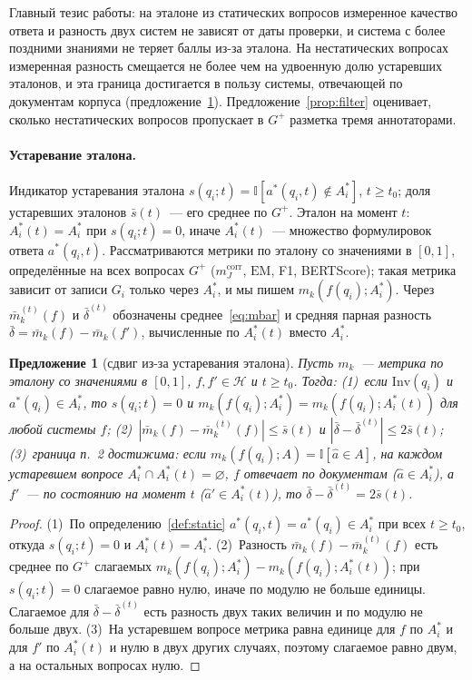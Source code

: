 \documentclass{article}
\newtheorem{proposition}[theorem]{Предложение}%
\newcommand{\I}{\mathbb{I}}                         %
\newcommand{\Inv}{\mathrm{Inv}}
\newcommand{\EM}{\mathrm{EM}}
\newcommand{\mcorr}{m_J^{\mathrm{corr}}}
\begin{document}
Главный тезис работы: на эталоне из статических вопросов измеренное качество ответа и разность двух систем не зависят от даты проверки, и система с более поздними знаниями не теряет баллы из-за эталона. На нестатических вопросах измеренная разность смещается не более чем на удвоенную долю устаревших эталонов, и эта граница достигается в пользу системы, отвечающей по документам корпуса (предложение~\ref{prop:bias}). Предложение~\ref{prop:filter} оценивает, сколько нестатических вопросов пропускает в $G^+$ разметка тремя аннотаторами.

\paragraph{Устаревание эталона.} Индикатор устаревания эталона $s(q_i;t)=\I[a^*(q_i,t)\notin A^*_i]$, $t\ge t_0$; доля устаревших эталонов $\bar s(t)$~--- его среднее по $G^+$. Эталон на момент $t$: $A^*_i(t)=A^*_i$ при $s(q_i;t)=0$, иначе $A^*_i(t)$~--- множество формулировок ответа $a^*(q_i,t)$. Рассматриваются метрики по эталону со значениями в $[0,1]$, определённые на всех вопросах $G^+$ ($\mcorr$, $\EM$, F1, BERTScore); такая метрика зависит от записи $G_i$ только через $A^*_i$, и мы пишем $m_k(f(q_i);A^*_i)$. Через $\bar m_k^{(t)}(f)$ и $\bar\delta^{(t)}$ обозначены среднее~\eqref{eq:mbar} и средняя парная разность $\bar\delta=\bar m_k(f)-\bar m_k(f')$, вычисленные по $A^*_i(t)$ вместо $A^*_i$.

\begin{proposition}[сдвиг из-за устаревания эталона]\label{prop:bias}
Пусть $m_k$~--- метрика по эталону со значениями в $[0,1]$, $f,f'\in\mathcal{H}$ и $t\ge t_0$. Тогда:
(1)~если $\Inv(q_i)$ и $a^*(q_i)\in A^*_i$, то $s(q_i;t)=0$ и $m_k(f(q_i);A^*_i)=m_k(f(q_i);A^*_i(t))$ для любой системы $f$;
(2)~$|\bar m_k(f)-\bar m_k^{(t)}(f)|\le\bar s(t)$ и $|\bar\delta-\bar\delta^{(t)}|\le2\bar s(t)$;
(3)~граница п.~2 достижима: если $m_k(f(q_i);A)=\I[\hat a\in A]$, на каждом устаревшем вопросе $A^*_i\cap A^*_i(t)=\varnothing$, $f$ отвечает по документам ($\hat a\in A^*_i$), а $f'$~--- по состоянию на момент $t$ ($\hat a'\in A^*_i(t)$), то $\bar\delta-\bar\delta^{(t)}=2\bar s(t)$.
\end{proposition}

\begin{proof}
(1)~По определению~\ref{def:static} $a^*(q_i,t)=a^*(q_i)\in A^*_i$ при всех $t\ge t_0$, откуда $s(q_i;t)=0$ и $A^*_i(t)=A^*_i$. (2)~Разность $\bar m_k(f)-\bar m_k^{(t)}(f)$ есть среднее по $G^+$ слагаемых $m_k(f(q_i);A^*_i)-m_k(f(q_i);A^*_i(t))$; при $s(q_i;t)=0$ слагаемое равно нулю, иначе по модулю не больше единицы. Слагаемое для $\bar\delta-\bar\delta^{(t)}$ есть разность двух таких величин и по модулю не больше двух. (3)~На устаревшем вопросе метрика равна единице для $f$ по $A^*_i$ и для $f'$ по $A^*_i(t)$ и нулю в двух других случаях, поэтому слагаемое равно двум, а на остальных вопросах нулю.
\end{proof}
\end{document}
